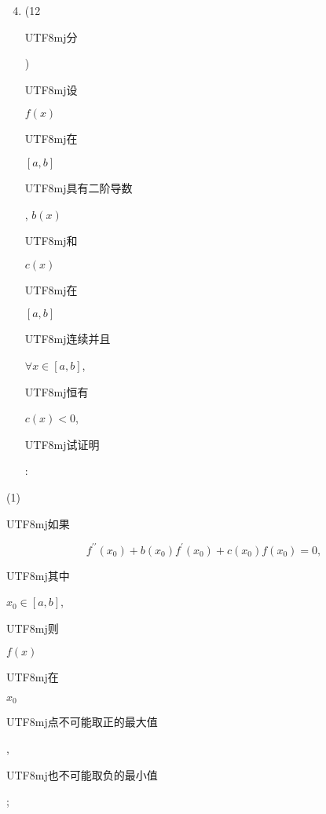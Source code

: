 \documentclass[10pt]{article}
\begin{document}
\begin{enumerate}
  \setcounter{enumi}{3}
  \item (12 \begin{CJK}{UTF8}{mj}分\end{CJK}) \begin{CJK}{UTF8}{mj}设\end{CJK} $f(x)$ \begin{CJK}{UTF8}{mj}在\end{CJK} $[a, b]$ \begin{CJK}{UTF8}{mj}具有二阶导数\end{CJK}, $b(x)$ \begin{CJK}{UTF8}{mj}和\end{CJK} $c(x)$ \begin{CJK}{UTF8}{mj}在\end{CJK} $[a, b]$ \begin{CJK}{UTF8}{mj}连续并且\end{CJK} $\forall x \in[a, b]$, \begin{CJK}{UTF8}{mj}恒有\end{CJK} $c(x)<0$, \begin{CJK}{UTF8}{mj}试证明\end{CJK}:
\end{enumerate}
(1) \begin{CJK}{UTF8}{mj}如果\end{CJK}
$$
f^{\prime \prime}\left(x_{0}\right)+b\left(x_{0}\right) f^{\prime}\left(x_{0}\right)+c\left(x_{0}\right) f\left(x_{0}\right)=0,
$$
\begin{CJK}{UTF8}{mj}其中\end{CJK} $x_{0} \in[a, b]$, \begin{CJK}{UTF8}{mj}则\end{CJK} $f(x)$ \begin{CJK}{UTF8}{mj}在\end{CJK} $x_{0}$ \begin{CJK}{UTF8}{mj}点不可能取正的最大值\end{CJK}, \begin{CJK}{UTF8}{mj}也不可能取负的最小值\end{CJK};
\end{document}
